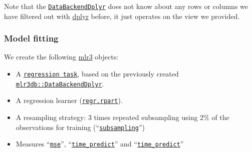 \documentclass[]{article}
\newenvironment{Shaded}{\begin{snugshade}}{\end{snugshade}}
\newcommand{\DataTypeTok}[1]{\textcolor[rgb]{0.13,0.29,0.53}{#1}}
\newcommand{\DecValTok}[1]{\textcolor[rgb]{0.00,0.00,0.81}{#1}}
\newcommand{\FloatTok}[1]{\textcolor[rgb]{0.00,0.00,0.81}{#1}}
\newcommand{\KeywordTok}[1]{\textcolor[rgb]{0.13,0.29,0.53}{\textbf{#1}}}
\newcommand{\NormalTok}[1]{#1}
\newcommand{\OperatorTok}[1]{\textcolor[rgb]{0.81,0.36,0.00}{\textbf{#1}}}
\newcommand{\StringTok}[1]{\textcolor[rgb]{0.31,0.60,0.02}{#1}}
\providecommand{\tightlist}{%
  \setlength{\itemsep}{0pt}\setlength{\parskip}{0pt}}
\renewenvironment{Shaded} {\begin{snugshade}\small} {\end{snugshade}}
\begin{document}
Note that the \href{https://mlr3db.mlr-org.com/reference/DataBackendDplyr.html}{\texttt{DataBackendDplyr}} does not know about any rows or columns we have filtered out with \href{https://cran.r-project.org/package=dplyr}{dplyr} before, it just operates on the view we provided.

\hypertarget{model-fitting}{%
\subsubsection{Model fitting}\label{model-fitting}}

We create the following \href{https://mlr3.mlr-org.com}{mlr3} objects:

\begin{itemize}
\tightlist
\item
  A \href{https://mlr3.mlr-org.com/reference/TaskRegr.html}{\texttt{regression\ task}}, based on the previously created \href{https://mlr3db.mlr-org.com/reference/DataBackendDplyr.html}{\texttt{mlr3db::DataBackendDplyr}}.
\item
  A regression learner (\href{https://mlr3.mlr-org.com/reference/mlr_learners_regr.rpart.html}{\texttt{regr.rpart}}).
\item
  A resampling strategy: 3 times repeated subsampling using 2\% of the observations for training (``\href{https://mlr3.mlr-org.com/reference/mlr_resamplings_subsampling.html}{\texttt{subsampling}}'')
\item
  Measures ``\href{https://mlr3.mlr-org.com/reference/mlr_measures_regr.mse.html}{\texttt{mse}}'', ``\href{https://mlr3.mlr-org.com/reference/mlr_measures_elapsed_time.html}{\texttt{time\_predict}}'' and ``\href{https://mlr3.mlr-org.com/reference/mlr_measures_elapsed_time.html}{\texttt{time\_predict}}''
\end{itemize}

\begin{Shaded}
\end{Shaded}
\end{document}
